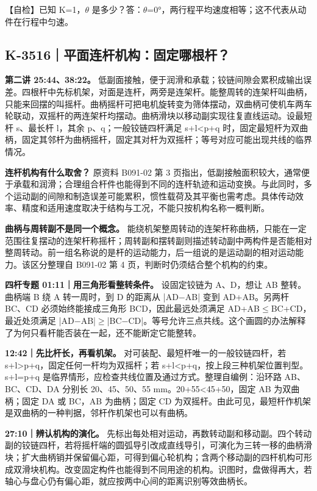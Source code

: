 \documentclass[zihao=5,a4paper,UTF8,fontset=fandol]{ctexart}
\begin{document}
【自检】已知 K=1，$\theta$ 是多少？答：$\theta$=0°，两行程平均速度相等；这不代表从动件在行程中匀速。





\subsection{K-3516｜平面连杆机构：固定哪根杆？}
\label{k-3516}

\textbf{第二讲 25:44、38:22。} 低副面接触，便于润滑和承载；铰链间隙会累积成输出误差。四根杆中先标机架，对面是连杆，两旁是连架杆。能整周转的连架杆叫曲柄，只能来回摆的叫摇杆。曲柄摇杆可把电机旋转变为筛体摆动，双曲柄可使机车两车轮联动，双摇杆的两连架杆均摆动。曲柄滑块以移动副实现往复直线运动。设最短杆 s、最长杆 l，其余 p、q；一般铰链四杆满足 s+l<p+q 时，固定最短杆为双曲柄，固定其邻杆为曲柄摇杆，固定其对杆为双摇杆；等号对应可能出现共线的临界情况。


\textbf{连杆机构有什么取舍？} 原资料 B091-02 第 3 页指出，低副接触面积较大，通常便于承载和润滑；合理组合杆件也能得到不同的连杆轨迹和运动变换。与此同时，多个运动副的间隙和制造误差可能累积，惯性载荷及其平衡也需考虑。具体传动效率、精度和适用速度取决于结构与工况，不能只按机构名称一概判断。


\textbf{曲柄与周转副不是同一个概念。} 能绕机架整周转动的连架杆称曲柄，只能在一定范围往复摆动的连架杆称摇杆；周转副和摆转副则描述转动副中两构件是否能相对整周转动。前一组名称说的是杆的运动能力，后一组说的是运动副的相对运动能力。该区分整理自 B091-02 第 4 页，判断时仍须结合整个机构的约束。


\textbf{四杆专题 01:11｜用三角形看整转条件。} 设固定铰链为 A、D，想让 AB 整转。曲柄端 B 绕 A 转一周时，到 D 的距离从 |AD$-$AB| 变到 AD+AB。另两杆 BC、CD 必须始终能接成三角形 BCD，因此最远处须满足 AD+AB$\le$BC+CD，最近处须满足 |AD$-$AB|$\ge$|BC$-$CD|。等号允许三点共线。这个画圆的办法解释了为何只看杆能否装在一起，还不能断定它能整转。


\textbf{12:42｜先比杆长，再看机架。} 对可装配、最短杆唯一的一般铰链四杆，若 s+l>p+q，固定任何一杆均为双摇杆；若 s+l<p+q，按上段三种机架位置判型。s+l=p+q 是临界情形，应检查共线位置及通过方式。整理自编例：沿环路 AB、BC、CD、DA 分别长 20、45、50、55 mm。20+55<45+50，固定 AB 为双曲柄；固定 DA 或 BC，AB 为曲柄；固定 CD 为双摇杆。由此可见，最短杆作机架是双曲柄的一种判据，邻杆作机架也可以有曲柄。


\textbf{27:10｜辨认机构的演化。} 先标出每处相对运动，再数转动副和移动副。四个转动副的铰链四杆，若将摇杆端的圆弧导引改成直线导引，可演化为三转一移的曲柄滑块；扩大曲柄销并保留偏心距，可得到偏心轮机构；含两个移动副的四杆机构可形成双滑块机构。改变固定构件也能得到不同用途的机构。识图时，盘做得再大，若轴心与盘心仍有偏心距，就应按两中心间的距离识别等效曲柄长。
\end{document}
